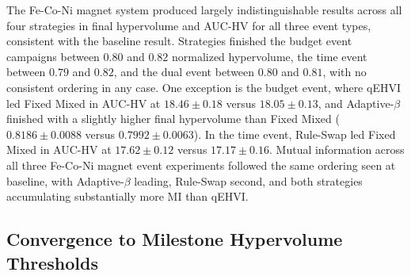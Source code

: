 The Fe-Co-Ni magnet system produced largely indistinguishable results across all four strategies in final hypervolume and AUC-HV for all three event types, consistent with the baseline result. Strategies finished the budget event campaigns between $0.80$ and $0.82$ normalized hypervolume, the time event between $0.79$ and $0.82$, and the dual event between $0.80$ and $0.81$, with no consistent ordering in any case. One exception is the budget event, where qEHVI led Fixed Mixed in AUC-HV at $18.46 \pm 0.18$ versus $18.05 \pm 0.13$, and Adaptive-$\beta$ finished with a slightly higher final hypervolume than Fixed Mixed ($0.8186 \pm 0.0088$ versus $0.7992 \pm 0.0063$). In the time event, Rule-Swap led Fixed Mixed in AUC-HV at $17.62 \pm 0.12$ versus $17.17 \pm 0.16$. Mutual information across all three Fe-Co-Ni magnet event experiments followed the same ordering seen at baseline, with Adaptive-$\beta$ leading, Rule-Swap second, and both strategies accumulating substantially more MI than qEHVI.

\subsection{Convergence to Milestone Hypervolume Thresholds}
\label{sec:results-convergence}

